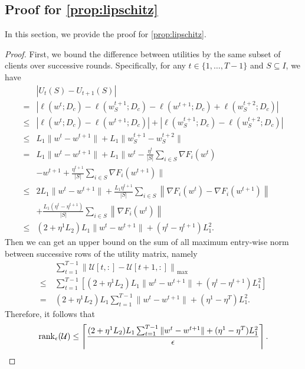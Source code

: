 \subsection{Proof for \autoref{prop:lipschitz}}
In this section, we provide the proof for \autoref{prop:lipschitz}. 
\begin{proof}
    First, we bound the difference between utilities by the same subset of clients over successive rounds. Specifically, for any $t\in\{1,\dots,T-1\}$ and $S \subseteq I$, we have 
    \begin{align*}
        &|U_{t}(S) - U_{t+1}(S)|\\
        = &|\ell(w^{t}; D_c) - \ell(w_S^{t+1}; D_c) - \ell(w^{t+1}; D_c) + \ell(w_S^{t+2}; D_c)|
        \\\leq &|\ell(w^{t}; D_c) - \ell(w^{t+1}; D_c)| + |\ell(w_S^{t+1}; D_c) - \ell(w_S^{t+2}; D_c)|
        \\\leq &L_1\|w^{t} - w^{t+1}\| + L_1\|w_S^{t+1} - w_S^{t+2}\|
        \\= &L_1\|w^{t} - w^{t+1}\| + L_1\bigg\|w^{t} - \frac{\eta^t}{|S|}\sum_{i\in S} \nabla F_i(w^{t})
        \\&  - w^{t+1} + \frac{\eta^{t+1}}{|S|}\sum_{i\in S} \nabla F_i(w^{t+1}) \bigg\|
        \\\leq &2L_1\|w^{t} - w^{t+1}\| + \frac{L_1\eta^{t+1}}{|S|}\sum_{i\in S}\left\|\nabla F_i(w^{t}) - \nabla F_i(w^{t+1})\right\| 
        \\&+ \frac{L_1(\eta^{t} - \eta^{t+1})}{|S|}\sum_{i\in S}\left\|\nabla F_i(w^{t})\right\|
        \\\leq &(2+\eta^1L_2) L_1\|w^{t} - w^{t+1}\| + (\eta^{t} - \eta^{t+1})L_1^2.
    \end{align*}
    Then we can get an upper bound on the sum of all maximum entry-wise norm between successive rows of the utility matrix, namely
    \begin{align*}
        &~\sum_{t=1}^{T-1} \left\|\mathcal{U}[t,:] - \mathcal{U}[t+1,:]\right\|_{\max} \\
        \leq &~\sum_{t=1}^{T-1}\left[ (2+\eta^1L_2) L_1\|w^{t} - w^{t+1}\| + (\eta^{t} - \eta^{t+1})L_1^2 \right]
        \\= &~(2+\eta^1L_2) L_1 \sum_{t=1}^{T-1} \|w^{t} - w^{t+1}\| + (\eta^1 - \eta^T)L_1^2.
    \end{align*}
    Therefore, it follows that 
    \begin{equation*}
        \operatorname{rank}_{\epsilon}(\mathcal{U}) \leq \left\lceil \frac{(2+\eta^1L_2) L_1 \sum_{t=1}^{T-1} \|w^{t} - w^{t+1}\| + (\eta^1 - \eta^T)L_1^2}{\epsilon} \right\rceil.
    \end{equation*}
\end{proof}

